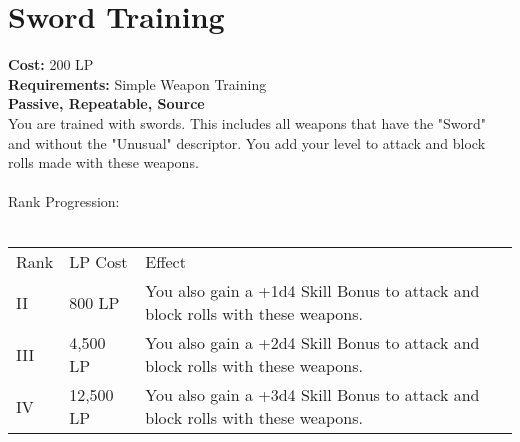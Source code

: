\section{Sword Training}\label{perk:swordTraining}
\textbf{Cost:} 200 LP\\
\textbf{Requirements:} Simple Weapon Training\\
\textbf{Passive, Repeatable, Source}\\
You are trained with swords.
This includes all weapons that have the "Sword" and without the "Unusual" descriptor.
You add your level to attack and block rolls made with these weapons.\\
\\
Rank Progression:\\
\\
\begin{longtable}{l | l | p{9cm}}
	Rank & LP Cost & Effect\\
	II & 800 LP & You also gain a +1d4 Skill Bonus to attack and block rolls with these weapons.\\
	III & 4,500 LP & You also gain a +2d4 Skill Bonus to attack and block rolls with these weapons.\\
	IV & 12,500 LP & You also gain a +3d4 Skill Bonus to attack and block rolls with these weapons.\\
\end{longtable}